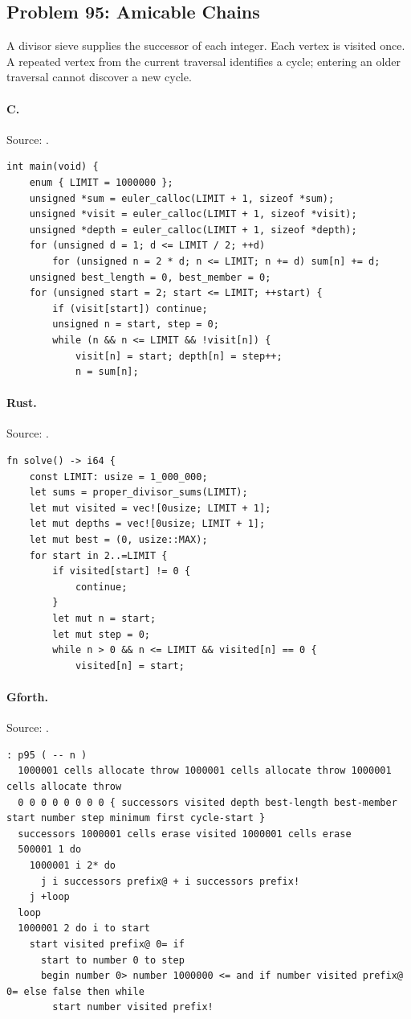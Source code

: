 \subsection{Problem 95: Amicable Chains}
\label{walkthrough:p95}
A divisor sieve supplies the successor of each integer. Each vertex is visited once. A repeated vertex from the current traversal identifies a cycle; entering an older traversal cannot discover a new cycle.

\paragraph{C.} Source: .
\begin{lstlisting}
int main(void) {
    enum { LIMIT = 1000000 };
    unsigned *sum = euler_calloc(LIMIT + 1, sizeof *sum);
    unsigned *visit = euler_calloc(LIMIT + 1, sizeof *visit);
    unsigned *depth = euler_calloc(LIMIT + 1, sizeof *depth);
    for (unsigned d = 1; d <= LIMIT / 2; ++d)
        for (unsigned n = 2 * d; n <= LIMIT; n += d) sum[n] += d;
    unsigned best_length = 0, best_member = 0;
    for (unsigned start = 2; start <= LIMIT; ++start) {
        if (visit[start]) continue;
        unsigned n = start, step = 0;
        while (n && n <= LIMIT && !visit[n]) {
            visit[n] = start; depth[n] = step++;
            n = sum[n];
\end{lstlisting}

\paragraph{Rust.} Source: .
\begin{lstlisting}
fn solve() -> i64 {
    const LIMIT: usize = 1_000_000;
    let sums = proper_divisor_sums(LIMIT);
    let mut visited = vec![0usize; LIMIT + 1];
    let mut depths = vec![0usize; LIMIT + 1];
    let mut best = (0, usize::MAX);
    for start in 2..=LIMIT {
        if visited[start] != 0 {
            continue;
        }
        let mut n = start;
        let mut step = 0;
        while n > 0 && n <= LIMIT && visited[n] == 0 {
            visited[n] = start;
\end{lstlisting}

\paragraph{Gforth.} Source: .
\begin{lstlisting}
: p95 ( -- n )
  1000001 cells allocate throw 1000001 cells allocate throw 1000001 cells allocate throw
  0 0 0 0 0 0 0 0 { successors visited depth best-length best-member start number step minimum first cycle-start }
  successors 1000001 cells erase visited 1000001 cells erase
  500001 1 do
    1000001 i 2* do
      j i successors prefix@ + i successors prefix!
    j +loop
  loop
  1000001 2 do i to start
    start visited prefix@ 0= if
      start to number 0 to step
      begin number 0> number 1000000 <= and if number visited prefix@ 0= else false then while
        start number visited prefix!
\end{lstlisting}

